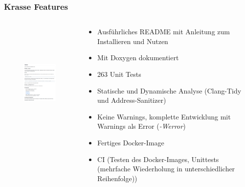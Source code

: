 \documentclass[aspectratio=169]{beamer}
\begin{document}
\begin{frame}
    \frametitle{Krasse Features}
    \begin{columns}
        \begin{column}{0.4\textwidth}
            \begin{center}
                \begin{figure}[H]
                    \includegraphics[height=6cm]{doku.png}
                \end{figure}
            \end{center}
        \end{column}
        \begin{column}{0.6\textwidth}
            \begin{itemize}
                \item Ausführliches README mit Anleitung zum Installieren und Nutzen
                    \pause
                \item Mit Doxygen dokumentiert
                    \pause
                \item 263 Unit Tests %
                    \pause
                \item Statische und Dynamische Analyse (Clang-Tidy und Address-Sanitizer)
                    \pause
                \item Keine Warnings, komplette Entwicklung mit Warnings als Error (\textit{-Werror})
                    \pause
                \item Fertiges Docker-Image
                    \pause
                \item CI (Testen des Docker-Images, Unittests (mehrfache Wiederholung in unterschiedlicher Reihenfolge))
            \end{itemize}
        \end{column}
    \end{columns}
\end{frame}
\end{document}
